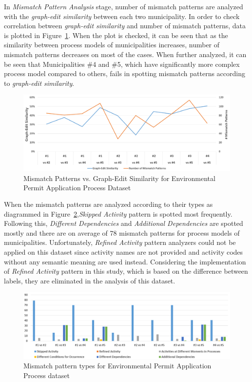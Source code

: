 In \textit{Mismatch Pattern Analysis} stage, number of mismatch patterns are analyzed with the \textit{graph-edit similarity} between each two municipality. In order to check correlation between \textit{graph-edit similarity} and number of mismatch patterns, data is plotted in Figure~\ref{fig:coselog-wabo-mismatch-pattern-analysis-results}. When the plot is checked, it can be seen that as the similarity between process models of municipalities increases, number of mismatch patterns decreases on most of the cases. When further analyzed, it can be seen that Municipalities \#4 and \#5, which have significantly more complex process model compared to others, fails in spotting mismatch patterns according to \textit{graph-edit similarity}.
\begin{figure}
	\centering
	\includegraphics[width=\textwidth]{5_results_discussions/coselog-wabo/mismatch-pattern-analysis-results}
	\caption{Mismatch Patterns vs. Graph-Edit Similarity for Environmental Permit Application Process Dataset}
  \label{fig:coselog-wabo-mismatch-pattern-analysis-results}
\end{figure}

When the mismatch patterns are analyzed according to their types as diagrammed in Figure~\ref{fig:coselog-wabo-mismatch-pattern-types},\textit{Skipped Activity} pattern is spotted most frequently. Following this, \textit{Different Dependencies} and \textit{Additional Dependencies} are spotted mostly and there are on average of 78 mismatch patterns for process models of municipalities. Unfortunately, \textit{Refined Activity} pattern analyzers could not be applied on this dataset since activity names are not provided and activity codes without any semantic meaning are used instead. Considering the implementation of \textit{Refined Activity} pattern in this study, which is based on the difference between labels, they are eliminated in the analysis of this dataset.
\begin{figure}
	\centering
	\includegraphics[width=\textwidth]{5_results_discussions/coselog-wabo/mismatch-pattern-types}
	\caption{Mismatch pattern types for Environmental Permit Application Process dataset}
  \label{fig:coselog-wabo-mismatch-pattern-types}
\end{figure} 

